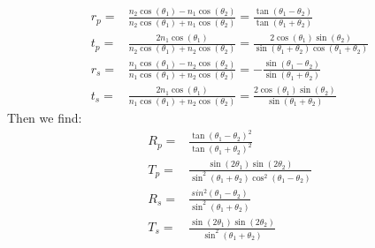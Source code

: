 \begin{align}
r_p = & \frac{n_{2}\cos(\theta_1)-n_1\cos(\theta_2)}{n_2\cos(\theta_1)+n_1\cos(\theta_2)} = \frac{\tan(\theta_1-\theta_2)}{\tan(\theta_1+\theta_2)}\\
%
t_p = & \frac{2n_1\cos(\theta_1)}{n_2\cos(\theta_1)+n_2\cos(\theta_2)} 
= \frac{2\cos(\theta_1)\sin(\theta_2)}{\sin(\theta_1+\theta_2)\cos(\theta_1+\theta_2)}\\
%
r_s = & \frac{n_1\cos(\theta_1)-n_2\cos(\theta_2)}{n_1\cos(\theta_1)+n_2\cos(\theta_2)}= -\frac{\sin(\theta_1-\theta_2)}{\sin(\theta_1+\theta_2)}\\
%
t_s = & \frac{2n_1\cos(\theta_1)}{n_1\cos(\theta_1)+n_2\cos(\theta_2)} = \frac{2\cos(\theta_1)\sin(\theta_2)}{\sin(\theta_1+\theta_2)}
\end{align}
%
Then we find:
\begin{align}
R_p = & \frac{\tan(\theta_1-\theta_2)^2}{\tan(\theta_1+\theta_2)^2}\\
T_p = & \frac{\sin(2\theta_1)\sin(2\theta_2)}{\sin^2(\theta_1+\theta_2)\cos^2(\theta_1-\theta_2)}\\
R_s = & \frac{sin^2(\theta_1-\theta_2)}{\sin^2(\theta_1+\theta_2)}\\
T_s = & \frac{\sin(2\theta_1)\sin(2\theta_2)}{\sin^2(\theta_1+\theta_2)}
\end{align}

	







